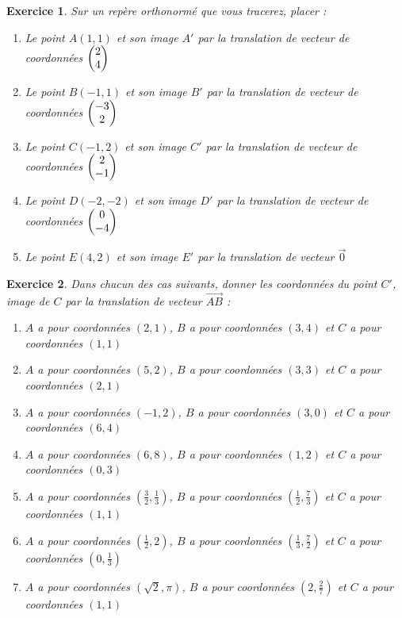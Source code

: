 \documentclass[10pt,a4paper]{article}
\newtheorem{exo}{Exercice}
\begin{document}
\begin{exo}
    Sur un repère orthonormé que vous tracerez, placer :
    \begin{enumerate}
            \item Le point $A(1,1)$ et son image $A'$ par la translation de vecteur de coordonnées $ \begin{pmatrix} 2\\ 4 \end{pmatrix}$
            \item Le point $B(-1,1)$ et son image $B'$ par la translation de vecteur de coordonnées  $ \begin{pmatrix} -3\\ 2 \end{pmatrix}$
            \item Le point $C(-1,2)$ et son image $C'$ par la translation de vecteur de coordonnées  $ \begin{pmatrix} 2\\ -1 \end{pmatrix}$
            \item Le point $D(-2,-2)$ et son image $D'$ par la translation de vecteur de coordonnées  $ \begin{pmatrix} 0\\ -4 \end{pmatrix}$
            \item Le point $E(4,2)$ et son image $E'$ par la translation de vecteur $\overrightarrow{0}$
    \end{enumerate}
\end{exo}

\begin{exo}
    Dans chacun des cas suivants, donner les coordonnées du point $C'$, image de $C$ par la translation de vecteur $\overrightarrow{AB}$ :
    \begin{enumerate}
        \item $A$ a pour coordonnées $(2,1)$, $B$ a pour coordonnées $(3,4)$ et $C$ a pour coordonnées $(1,1)$
        \item $A$ a pour coordonnées $(5,2)$, $B$ a pour coordonnées $(3,3)$ et $C$ a pour coordonnées $(2,1)$
        \item $A$ a pour coordonnées $(-1,2)$, $B$ a pour coordonnées $(3,0)$ et $C$ a pour coordonnées $(6,4)$
        \item $A$ a pour coordonnées $(6,8)$, $B$ a pour coordonnées $(1,2)$ et $C$ a pour coordonnées $(0,3)$
        \item $A$ a pour coordonnées $(\frac{3}{2},\frac{1}{3})$, $B$ a pour coordonnées $(\frac{1}{2},\frac{7}{3})$ et $C$ a pour coordonnées $(1,1)$
        \item $A$ a pour coordonnées $(\frac{1}{2},2)$, $B$ a pour coordonnées $(\frac{1}{3},\frac{7}{2})$ et $C$ a pour coordonnées $(0,\frac{1}{3})$
        \item $A$ a pour coordonnées $(\sqrt{2},\pi)$, $B$ a pour coordonnées $(2,\frac{2}{7})$ et $C$ a pour coordonnées $(1,1)$
    \end{enumerate}
\end{exo}
\end{document}
